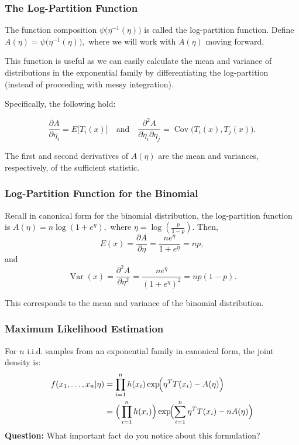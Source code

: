 \documentclass{beamer}
\begin{document}
\begin{frame}
\frametitle{The Log-Partition Function}

The function composition $\psi\bigl(\eta^{-1}(\eta)\bigr)$ is called the log-partition function. Define $A(\eta) = \psi\bigl(\eta^{-1}(\eta)\bigr),$ where we will work with $A(\eta)$ moving forward. 

\vspace*{1em}

This function is useful as we can easily calculate the mean and variance of distributions in the exponential family by differentiating the log-partition (instead of proceeding with messy integration).

\vspace*{1em}

Specifically, the following hold:

\[
\frac{\partial A}{\partial \eta_i} = E\bigl[T_i(x)\bigr] \quad \text{and} \quad \frac{\partial^2 A}{\partial \eta_i \partial \eta_j} = \operatorname{Cov}\bigl(T_i(x), T_j(x)\bigr).
\]

The first and second derivatives of $A(\eta)$ are the mean and variances, respectively, of the sufficient statistic. 
\end{frame}

\begin{frame}
\frametitle{Log-Partition Function for the Binomial}
Recall in canonical form for the binomial distribution, the log-partition function is $A(\eta) = n \log(1 + e^{\eta}),$ where $\eta = \log(\frac{p}{1-p}).$
\vspace*{1em}
Then,
\[
E(x) = \frac{\partial A}{\partial \eta} = \frac{n e^\eta}{1+e^\eta} = np,
\]
and
\[
\operatorname{Var}(x) = \frac{\partial^2 A}{\partial \eta^2} = \frac{n e^\eta}{(1+e^\eta)^2} = np(1-p).
\]
\vspace*{1em}

This corresponds to the mean and variance of the binomial distribution.
\end{frame}

\begin{frame}
\frametitle{Maximum Likelihood Estimation}
For $n$ i.i.d. samples from an exponential family in canonical form, the joint density is:
\begin{align}
f(x_1,\dots,x_n|\eta) &= \prod_{i=1}^n h(x_i) \exp\!\Bigl(\eta^T T(x_i) - A(\eta)\Bigr) \\
&= \Big(
\prod_{i=1}^n h(x_i)
\Big)
\exp\!\Bigl(\sum_{i=1}^n \eta^T T(x_i) - nA(\eta)\Bigr) 
\end{align}
\textbf{Question:} What important fact do you notice about this formulation?
\end{frame}
\end{document}
